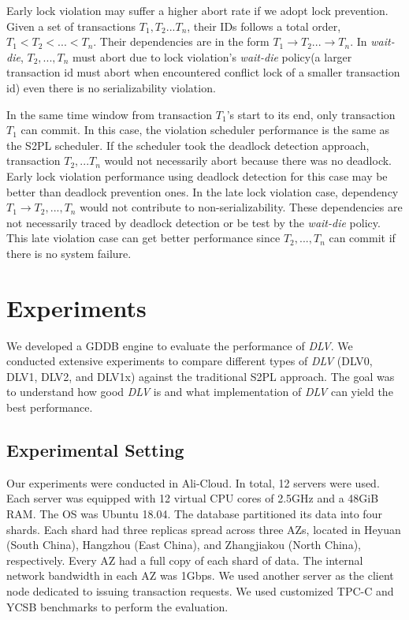 \documentclass[conference]{IEEEtran}
\begin{document}
Early lock violation may suffer a higher abort rate if we adopt lock prevention.
Given a set of transactions ${T_1, T_2... T_n}$, their IDs follows a total order, ${T_1 < T_2 < ... < T_n}$.
Their dependencies are in the form ${T_1 \rightarrow T_2 ... \rightarrow T_n}$.
In \emph{wait-die}, ${T_2, ..., T_n}$ must abort due to lock violation's \emph{wait-die} policy(a larger transaction id must abort when encountered conflict lock of a smaller transaction id) even there is no serializability violation.

In the same time window from transaction ${T_1}$'s start to its end, only transaction ${T_1}$ can commit.
In this case, the violation scheduler performance is the same as the S2PL scheduler.
If the scheduler took the deadlock detection approach, transaction ${T_2, ... T_n}$ would not necessarily abort because there was no deadlock.
Early lock violation performance using deadlock detection for this case may be better than deadlock prevention ones.
In the late lock violation case, dependency ${T_1 \rightarrow T_2 , ... ,T_n}$ would not contribute to non-serializability.
These dependencies are not necessarily traced by deadlock detection or be test by the \emph{wait-die} policy.
This late violation case can get better performance since ${T_2,..., T_n}$ can commit if there is no system failure.

\section{Experiments}
\label{sec:experiment}
We developed a GDDB engine to evaluate the performance of \emph{DLV}.
We conducted extensive experiments to compare different types of \emph{DLV} (DLV0, DLV1, DLV2, and DLV1x) against the traditional S2PL approach.
The goal was to understand how good \emph{DLV} is and what implementation of \emph{DLV} can yield the best performance. 

\subsection{Experimental Setting}
\label{subsec:exp_setting}

Our experiments were conducted in Ali-Cloud.
In total, 12 servers were used.
Each server was equipped with 12 virtual CPU cores of 2.5GHz and a 48GiB RAM.
The OS was Ubuntu 18.04.
The database partitioned its data into four shards.
Each shard had three replicas spread across three AZs,
located in Heyuan (South China), Hangzhou (East China), and Zhangjiakou (North China), respectively.
Every AZ had a full copy of each shard of data.
The internal network bandwidth in each AZ was 1Gbps.
We used another server as the client node dedicated to issuing transaction requests.
We used customized TPC-C and YCSB benchmarks to perform the evaluation.
\end{document}
